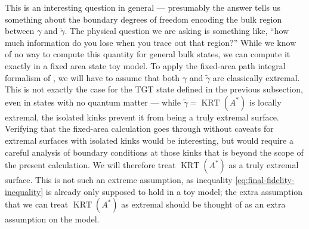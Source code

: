 \documentclass[a4paper,11pt]{article}
\renewcommand{\tilde}{\widetilde}
\newcommand{\KRT}{\operatorname{KRT}}
\begin{document}
This is an interesting question in general --- presumably the answer tells us something about the boundary degrees of freedom encoding the bulk region between $\gamma$ and $\tilde{\gamma}$. The physical question we are asking is something like, ``how much information do you lose when you trace out that region?'' While we know of no way to compute this quantity for general bulk states, we can compute it exactly in a fixed area state toy model. To apply the fixed-area path integral formalism of \cite{fixed-area-DHM}, we will have to assume that both $\gamma$ and $\tilde{\gamma}$ are classically extremal. This is not exactly the case for the TGT state defined in the previous subsection, even in states with no quantum matter --- while $\tilde{\gamma} = \KRT(A^*)$ is locally extremal, the isolated kinks prevent it from being a truly extremal surface. Verifying that the fixed-area calculation goes through without caveats for extremal surfaces with isolated kinks would be interesting, but would require a careful analysis of boundary conditions at those kinks that is beyond the scope of the present calculation. We will therefore treat $\KRT(A^*)$ as a truly extremal surface. This is not such an extreme assumption, as inequality \eqref{eq:final-fidelity-inequality} is already only supposed to hold in a toy model; the extra assumption that we can treat $\KRT(A^*)$ as extremal should be thought of as an extra assumption on the model.
\end{document}
